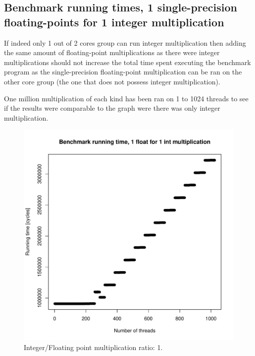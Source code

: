 \documentclass{article}
\def \scalingfactor{.8}
\begin{document}
	\subsection{Benchmark running times, 1 single-precision floating-points for 1 integer multiplication}
	If indeed only 1 out of 2 cores group can run integer multiplication then
    adding the same amount of floating-point multiplications as there were integer
    multiplications should not increase the total time spent executing the benchmark 
    program as the single-precision floating-point multiplication can
    be ran on the other core group (the one that does not possess integer multiplication).
	
	One million multiplication of each kind has been ran on 1 to 1024 threads to
    see if the results were comparable to the graph were there was only integer multiplication.
	\begin{figure}[h]
		\centering
		\vspace{-20pt}
    			\includegraphics[width=\scalingfactor\linewidth]{"graphics/running_times_ratio11"}
		\vspace{-15pt}
		\captionsetup{justification=centering}
		\caption{Integer/Floating point multiplication ratio: 1.}
	\end{figure}
	\pagebreak
\end{document}

